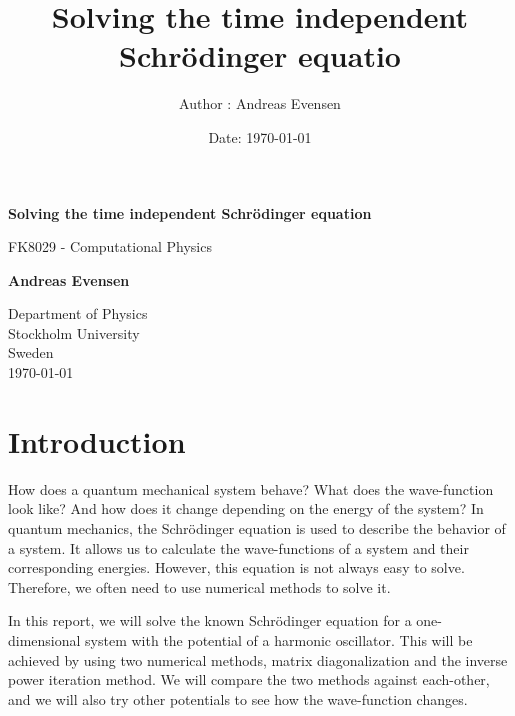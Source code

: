 \documentclass[a4paper]{article}
\title{Solving the time independent Schrödinger equatio}
\author{Author : Andreas Evensen}
\date{Date: \today}
\newcommand{\newparagraph}{\vspace{.5cm}\noindent}
\begin{document}
\begin{titlepage}
    \begin{center}
        \vspace*{1cm}
        
        \Huge
        \textbf{Solving the time independent Schrödinger equation}
        
        \vspace{0.5cm}
        \LARGE
        FK8029 - Computational Physics
        
        \vspace{1.5cm}
        
        \textbf{Andreas Evensen}
        
        \vfill
        
        
        \Large
        Department of Physics\\
        Stockholm University\\
        Sweden\\
        \today
    \end{center}
\end{titlepage}


\tableofcontents

\section{Introduction}
How does a quantum mechanical system behave?
What does the wave-function look like? And how does it change depending on the energy of the system?
In quantum mechanics, the Schrödinger equation is used to describe the behavior of a system.
It allows us to calculate the wave-functions of a system and their corresponding energies.
However, this equation is not always easy to solve. Therefore, we often need to use numerical methods to solve it.

\newparagraph
In this report, we will solve the known Schrödinger equation for a one-dimensional system with the potential of a harmonic oscillator.
This will be achieved by using two numerical methods, matrix diagonalization and the inverse power iteration method.
We will compare the two methods against each-other, and we will also try other potentials to see how the wave-function changes.
\end{document}
